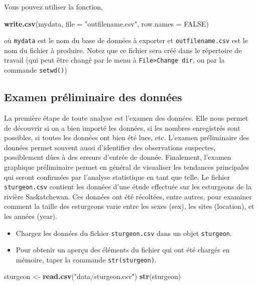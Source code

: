 \documentclass[
  12pt,
]{book}
\newenvironment{Shaded}{\begin{snugshade}}{\end{snugshade}}
\newcommand{\DataTypeTok}[1]{\textcolor[rgb]{0.13,0.29,0.53}{#1}}
\newcommand{\KeywordTok}[1]{\textcolor[rgb]{0.13,0.29,0.53}{\textbf{#1}}}
\newcommand{\NormalTok}[1]{#1}
\newcommand{\OtherTok}[1]{\textcolor[rgb]{0.56,0.35,0.01}{#1}}
\newcommand{\StringTok}[1]{\textcolor[rgb]{0.31,0.60,0.02}{#1}}
\providecommand{\tightlist}{%
  \setlength{\itemsep}{0pt}\setlength{\parskip}{0pt}}
\begin{document}
Vous pouvez utiliser la fonction,

\begin{Shaded}
\begin{Highlighting}[]
\KeywordTok{write.csv}\NormalTok{(mydata, }\DataTypeTok{file =} \StringTok{"outfilename.csv"}\NormalTok{, }\DataTypeTok{row.names =} \OtherTok{FALSE}\NormalTok{)}
\end{Highlighting}
\end{Shaded}

où \texttt{mydata} est le nom du base de données à exporter et \texttt{outfilename.csv} est le nom du fichier à produire.
Notez que ce fichier sera créé dans le répertoire de travail (qui peut être changé par le menu à \texttt{File\textgreater{}Change\ dir}, ou par la commande \texttt{setwd()})

\hypertarget{examen-pruxe9liminaire-des-donnuxe9es}{%
\subsection{Examen préliminaire des données}\label{examen-pruxe9liminaire-des-donnuxe9es}}

La première étape de toute analyse est l'examen des données.
Elle nous permet de découvrir si on a bien importé les données, si les nombres enregistrés sont possibles, si toutes les données ont bien été lues, etc.
L'examen préliminaire des données permet souvent aussi d'identifier des observations suspectes, possiblement dûes à des erreurs d'entrée de donnée.
Finalement, l'examen graphique préliminaire permet en général de visualiser les tendances principales qui seront confirmées par l'analyse statistique en tant que telle.
Le fichier \texttt{sturgeon.csv} contient les données d'une étude effectuée sur les esturgeons de la rivière Saskatchewan.
Ces données ont été récoltées, entre autres, pour examiner comment la taille des esturgeons varie entre les sexes (sex), les sites (location), et les années (year).

\begin{itemize}
\tightlist
\item
  Chargez les données du fichier \texttt{sturgeon.csv} dans un objet \texttt{sturgeon}.
\item
  Pour obtenir un aperçu des éléments du fichier qui ont été chargés en mémoire, taper la commande \texttt{str(sturgeon)}.
\end{itemize}

\begin{Shaded}
\begin{Highlighting}[]
\NormalTok{sturgeon \textless{}{-}}\StringTok{ }\KeywordTok{read.csv}\NormalTok{(}\StringTok{"data/sturgeon.csv"}\NormalTok{)}
\KeywordTok{str}\NormalTok{(sturgeon)}
\end{Highlighting}
\end{Shaded}
\end{document}
